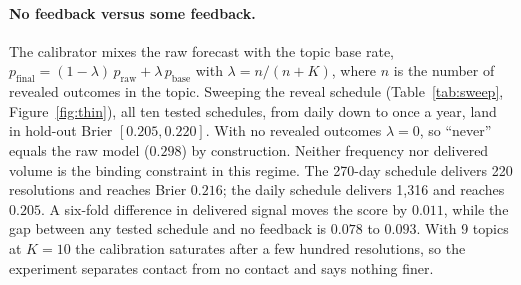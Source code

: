 \documentclass[11pt]{article}
\begin{document}
\paragraph{No feedback versus some feedback.} The calibrator mixes the raw
forecast with the topic base rate, $p_{\text{final}}=(1-\lambda)\,p_{\text{raw}}
+\lambda\,p_{\text{base}}$ with $\lambda=n/(n+K)$, where $n$ is the number of
revealed outcomes in the topic. Sweeping the reveal schedule
(Table~\ref{tab:sweep}, Figure~\ref{fig:thin}), all ten tested schedules,
from daily down to once a year, land in hold-out Brier $[0.205,0.220]$.
With no revealed outcomes $\lambda=0$, so ``never'' equals the raw model
($0.298$) by construction. Neither
frequency nor delivered volume is the binding constraint in this regime. The
270-day schedule delivers 220 resolutions and reaches Brier $0.216$; the daily
schedule delivers 1{,}316 and reaches $0.205$. A six-fold difference in
delivered signal moves the score by $0.011$, while the gap between any tested
schedule and no feedback is $0.078$ to $0.093$. With 9 topics at $K=10$ the
calibration saturates after a few hundred resolutions, so the experiment
separates contact from no contact and says nothing finer.
\end{document}
